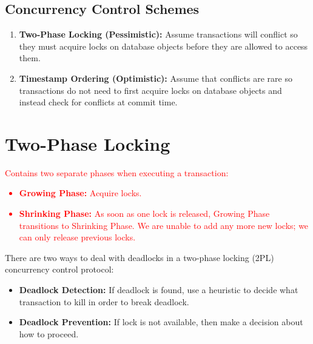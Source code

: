 \documentclass[11pt]{article}
\newcommand{\rr}[1]{\textcolor{red}{#1}}
\begin{document}
\subsection*{Concurrency Control Schemes}
\begin{enumerate}
    \item \textbf{Two-Phase Locking (Pessimistic):}
    Assume transactions will conflict so they must acquire locks on database objects before they 
    are allowed to access them.
    
    \item \textbf{Timestamp Ordering (Optimistic):}
    Assume that conflicts are rare so transactions do not need to first acquire locks on database 
    objects and instead check for conflicts at commit time.
\end{enumerate}

\section{Two-Phase Locking}
\rr{Contains two separate phases when executing a transaction: 
\begin{itemize}
    \item \textbf{Growing Phase:} Acquire locks.
    \item \textbf{Shrinking Phase:} As soon as one lock is released, Growing Phase transitions to Shrinking Phase. We are unable to add any more new locks; we can only release previous locks.
\end{itemize}
}

There are two ways to deal with deadlocks in a two-phase locking (2PL) concurrency control protocol:

\begin{itemize}
    \item \textbf{Deadlock Detection:}
    If deadlock is found, use a heuristic to decide what transaction to kill in order to break 
    deadlock.
    
    \item \textbf{Deadlock Prevention:}
    If lock is not available, then make a decision about how to proceed.
\end{itemize}

\end{document}
